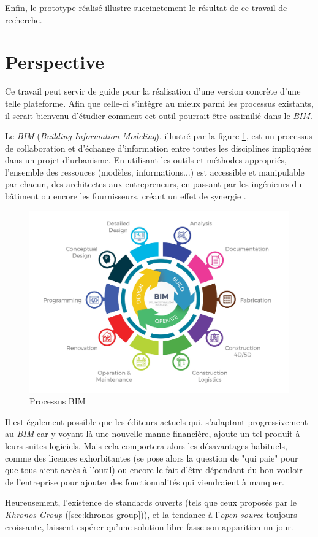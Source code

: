 Enfin, le prototype réalisé illustre succinctement le résultat de ce travail de recherche.

\section{Perspective}
Ce travail peut servir de guide pour la réalisation d'une version concrète d'une telle plateforme. Afin que celle-ci s'intègre au mieux parmi les processus existants, il serait bienvenu d'étudier comment cet outil pourrait être assimilié dans le \textit{BIM}.

Le \textit{BIM} (\textit{Building Information Modeling}), illustré par la figure \ref{fig:bim-process}, est un processus de collaboration et d'échange d'information entre toutes les disciplines impliquées dans un projet d'urbanisme. En utilisant les outils et méthodes appropriés, l'ensemble des ressouces (modèles, informations...) est accessible et manipulable par chacun, des architectes aux entrepreneurs, en passant par les ingénieurs du bâtiment ou encore les fournisseurs, créant un effet de synergie \cite{buildingsmart}.

\begin{figure}[h]
    \centering
    \includegraphics[width=0.7\linewidth]{Figures/bim-process.jpg}
    \caption{Processus BIM}
    \label{fig:bim-process}
\end{figure}

Il est également possible que les éditeurs actuels qui, s'adaptant progressivement au \textit{BIM} car y voyant là une nouvelle manne financière, ajoute un tel produit à leurs suites logiciels. Mais cela comportera alors les désavantages habituels, comme des licences exhorbitantes (se pose alors la question de "qui paie" pour que tous aient accès à l'outil) ou encore le fait d'être dépendant du bon vouloir de l'entreprise pour ajouter des fonctionnalités qui viendraient à manquer.  

Heureusement, l'existence de standards ouverts (tels que ceux proposés par le \textit{Khronos Group} (\ref{sec:khronos-group})), et la tendance à l'\textit{open-source} toujours croissante, laissent espérer qu'une solution libre fasse son apparition un jour.